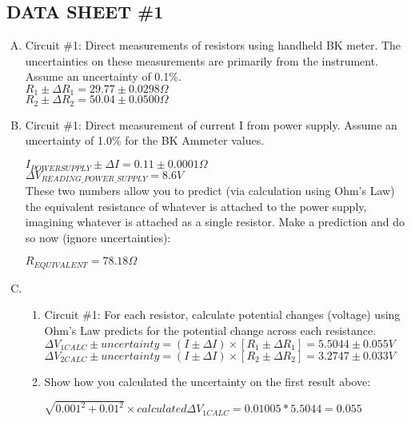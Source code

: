 \subsection{DATA SHEET \#1}
	\begin{enumerate}[A.]
		\item	Circuit \#1: Direct measurements of resistors using handheld BK meter.  The uncertainties on these measurements are primarily from the instrument.  Assume an uncertainty of 0.1\%.\\
		
		$R_1 \pm \Delta R_1 = 29.77 \pm 0.0298 \Omega$\\
		$R_2 \pm \Delta R_2 = 50.04 \pm 0.0500 \Omega$\\
		
		\item Circuit \#1: Direct measurement of current I from power supply.  Assume an uncertainty of 1.0\% for the BK Ammeter values.
		
		$I_{POWER SUPPLY} \pm \Delta I = 0.11 \pm 0.0001 \Omega$\\
		
		$\Delta V_{READING\_POWER\_SUPPLY} = 8.6 V$\\
		
		These two numbers allow you to predict (via calculation using Ohm's Law) the equivalent resistance of whatever is attached to the power supply, imagining whatever is attached as a single resistor.  Make a prediction and do so now (ignore uncertainties):
		
		$R_{EQUIVALENT} = 78.18 \Omega$\\
		
		\item
			\begin{enumerate}[1.]
			
				\item Circuit \#1:  For each resistor, calculate potential changes (voltage) using Ohm's Law predicts for the potential change across each resistance.\\
				
				$\Delta V_{1CALC} \pm uncertainty = (I \pm \Delta I) \times [R_1 \pm \Delta R_1] = 5.5044 \pm  0.055 V$\\ 
				
				$\Delta V_{2CALC} \pm uncertainty = (I \pm \Delta I) \times [R_2 \pm \Delta R_2] = 3.2747 \pm 0.033 V$\\
			
				\item Show how you calculated the uncertainty on the first result above:
				
				$\sqrt{0.001^2 + 0.01^2} \times calculated  \Delta V_{1CALC} = 0.01005 * 5.5044 = 0.055$ \\
					
			\end{enumerate}
			
	\end{enumerate}